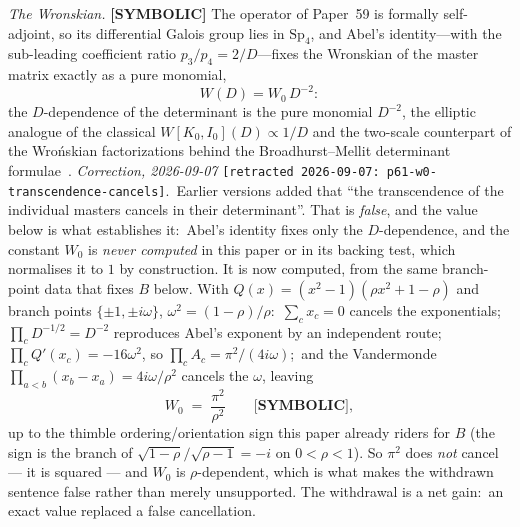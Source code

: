 \documentclass[aps,pra,twocolumn,superscriptaddress,longbibliography]{revtex4-2}
\begin{document}
\emph{The Wronskian.}  \textbf{[SYMBOLIC]} The operator of Paper~59 is formally
self-adjoint, so its differential Galois group lies
in $\mathrm{Sp}_{4}$, and Abel's identity---with the sub-leading coefficient
ratio $p_{3}/p_{4}=2/D$---fixes the Wronskian of the master matrix exactly as a
pure monomial,
%
\begin{equation}
W(D)=W_{0}\,D^{-2}:
\end{equation}
%
the $D$-dependence of the determinant is the pure monomial $D^{-2}$, the
elliptic analogue of the classical $W[K_{0},I_{0}](D)\propto 1/D$ and the
two-scale counterpart of the Wro\'nskian factorizations behind the
Broadhurst--Mellit determinant formulae~\cite{zhou_wronskian2018}.
%
\emph{Correction, 2026-09-07}
\texttt{[retracted 2026-09-07: p61-w0-transcendence-cancels]}.\ Earlier versions
added that ``the transcendence of the individual masters cancels in their
determinant''. That is \emph{false}, and the value below is what establishes
it:\ Abel's identity fixes only the
$D$-dependence, and the constant $W_{0}$ is \emph{never computed} in this paper
or in its backing test, which normalises it to $1$ by construction. It is now
computed, from the same branch-point data that fixes $B$ below. With
$Q(x)=(x^{2}-1)(\rho x^{2}+1-\rho)$ and branch points $\{\pm1,\pm i\omega\}$,
$\omega^{2}=(1-\rho)/\rho$:\ $\sum_{c}x_{c}=0$ cancels the exponentials;\
$\prod_{c}D^{-1/2}=D^{-2}$ reproduces Abel's exponent by an independent route;\
$\prod_{c}Q'(x_{c})=-16\omega^{2}$, so $\prod_{c}A_{c}=\pi^{2}/(4i\omega)$;\ and
the Vandermonde $\prod_{a<b}(x_{b}-x_{a})=4i\omega/\rho^{2}$ cancels the
$\omega$, leaving
%
\begin{equation}
W_{0}\;=\;\frac{\pi^{2}}{\rho^{2}}
\qquad \textbf{[SYMBOLIC]},
\label{eq:W0}
\end{equation}
%
up to the thimble ordering/orientation sign this paper already riders for $B$
(the sign is the branch of $\sqrt{1-\rho}/\sqrt{\rho-1}=-i$ on $0<\rho<1$).
So $\pi^{2}$ does \emph{not} cancel --- it is squared --- and $W_{0}$ is
$\rho$-dependent, which is what makes the withdrawn sentence false rather than
merely unsupported. The withdrawal is a net gain:\ an exact value replaced a
false cancellation.
\end{document}
